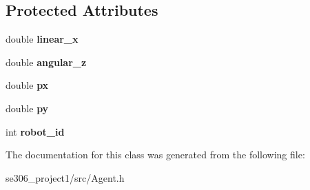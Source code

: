 \subsection*{Protected Attributes}
\begin{DoxyCompactItemize}
\item 
\hypertarget{classAgent_a77dfc60513d8c90b2848297e09fffba7}{double {\bfseries linear\-\_\-x}}\label{classAgent_a77dfc60513d8c90b2848297e09fffba7}

\item 
\hypertarget{classAgent_affc842049c5010a5f8bd99a62d650a25}{double {\bfseries angular\-\_\-z}}\label{classAgent_affc842049c5010a5f8bd99a62d650a25}

\item 
\hypertarget{classAgent_af51536ae3b511b53726b84b9226cc772}{double {\bfseries px}}\label{classAgent_af51536ae3b511b53726b84b9226cc772}

\item 
\hypertarget{classAgent_a048e8b32d02a2fd58f046a444a287015}{double {\bfseries py}}\label{classAgent_a048e8b32d02a2fd58f046a444a287015}

\item 
\hypertarget{classAgent_aefcf2085a669d7e91d932e7cc3ee88ce}{int {\bfseries robot\-\_\-id}}\label{classAgent_aefcf2085a669d7e91d932e7cc3ee88ce}

\end{DoxyCompactItemize}


The documentation for this class was generated from the following file\-:\begin{DoxyCompactItemize}
\item 
se306\-\_\-project1/src/Agent.\-h\end{DoxyCompactItemize}
